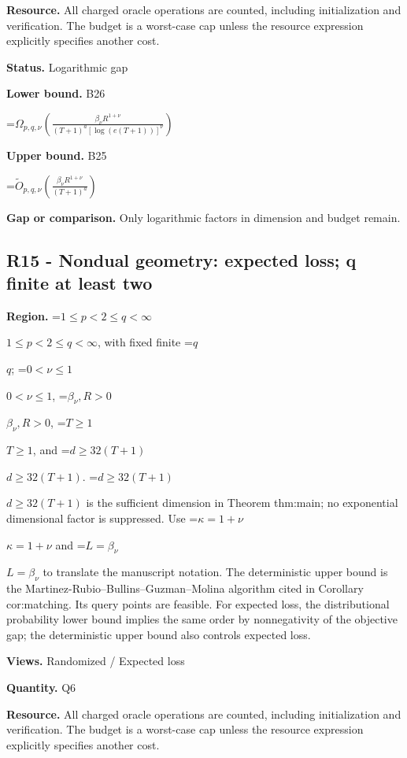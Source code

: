 \documentclass[10pt,a4paper]{article}
\newcommand{\AtlasMath}[1]{\par\begingroup\centering\setbox0=\hbox{$\displaystyle #1$}\ifdim\wd0>1.4\linewidth\typeout{ATLAS WIDE FORMULA: \the\wd0}\fi\ifdim\wd0>\linewidth\resizebox{\linewidth}{!}{\box0}\else\box0\fi\par\endgroup}
\newcommand{\AtlasInlineMath}[1]{\begingroup\setbox0=\hbox{$#1$}\ifdim\wd0>.4\linewidth\endgroup\AtlasMath{#1}\else\endgroup$#1$\fi}
\begin{document}
\textbf{Resource.} All charged oracle operations are counted, including initialization and verification. The budget is a worst-case cap unless the resource expression explicitly specifies another cost.



\textbf{Status.} Logarithmic gap



\textbf{Lower bound.} B26



\AtlasMath{\Omega_{p,q,\nu}\!\left(\frac{\beta_\nu R^{1+\nu}}{(T+1)^a[\log(e(T+1))]^\nu}\right)}


\textbf{Upper bound.} B25



\AtlasMath{\widetilde O_{p,q,\nu}\!\left(\frac{\beta_\nu R^{1+\nu}}{(T+1)^a}\right)}


\textbf{Gap or comparison.} Only logarithmic factors in dimension and budget remain.



\subsection{R15 - Nondual geometry: expected loss; q finite at least two}


\textbf{Region.} \AtlasInlineMath{1\le p<2\le q<\infty}, with fixed finite \AtlasInlineMath{q}; \AtlasInlineMath{0<\nu\le1}, \AtlasInlineMath{\beta_\nu,R>0}, \AtlasInlineMath{T\ge1}, and \AtlasInlineMath{d\ge32(T+1)}. \AtlasInlineMath{d\ge32(T+1)} is the sufficient dimension in Theorem thm:main; no exponential dimensional factor is suppressed. Use \AtlasInlineMath{\kappa=1+\nu} and \AtlasInlineMath{L=\beta_\nu} to translate the manuscript notation. The deterministic upper bound is the Martinez-Rubio--Bullins--Guzman--Molina algorithm cited in Corollary cor:matching. Its query points are feasible. For expected loss, the distributional probability lower bound implies the same order by nonnegativity of the objective gap; the deterministic upper bound also controls expected loss.



\textbf{Views.} Randomized / Expected loss



\textbf{Quantity.} Q6



\textbf{Resource.} All charged oracle operations are counted, including initialization and verification. The budget is a worst-case cap unless the resource expression explicitly specifies another cost.
\end{document}
